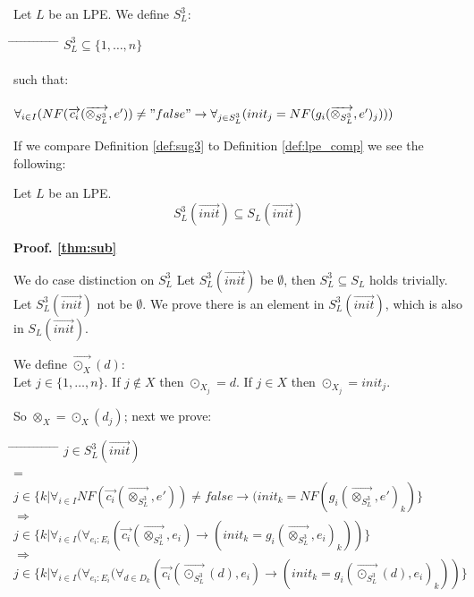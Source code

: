 \index{}\documentclass[a4paper,10pt]{article}
\theoremstyle{plain}
\theoremstyle{definition}
\newcommand{\ovr}{\overrightarrow}
\newcommand{\tb}{\textbf}
\newcommand{\tab}{\hspace*{5.mm} \= \hspace*{5.mm} \= \hspace*{5.mm} \= \hspace*{5.mm} \= \hspace*{5.mm} \= \hspace*{5.mm}  \= \hspace*{5.mm}  \= \hspace*{5.mm}  \= \hspace*{5.mm} \= \hspace*{5.mm} \= \hspace*{5.mm}  \= \hspace*{5.mm}  \= \hspace*{5.mm}\kill}
\begin{document}
\begin{defn} \label{def:sug3} Let $L$ be an LPE. We define $S_L^3$:

\begin{tabbing}
\tab
$ S_L^3 \subseteq \lbrace 1, \ldots, n \rbrace $ \\ \\
such that:\\ \\
$\forall_{i \in I} (NF( \ovr{c_i} ( \ovr{\otimes_{S_L^3}}, e' ) ) \not= "false" \rightarrow \forall_{j \in S_L^3}(init_j =  NF( g_i(\ovr{\otimes_{S_L^3}}, e' )_j))) $
\end{tabbing}
If we compare Definition \ref{def:sug3} to Definition \ref{def:lpe_comp} we see the following:
\begin{thm} Let $L$ be an LPE. \label{thm:sub}
$$S_L^3(\ovr{init}) \subseteq S_L(\ovr{init}) $$
\end{thm} 
\begin{flushleft}
\tb{Proof. \ref{thm:sub}}
\end{flushleft}
We do case distinction on $S_L^3$
Let $S_L^3(\ovr{init})$ be $\emptyset$, then $S_L^3 \subseteq S_L$ holds trivially.
Let $S_L^3(\ovr{init})$ not be $\emptyset$. We prove there is an element in $S_L^3(\ovr{init})$, which is also in $S_L(\ovr{init})$.
\begin{defn} We define $\ovr{\odot_X}(d)$:\\
Let $j \in \lbrace 1, \dots, n \rbrace $. 
If $j \not\in X$ then $\odot_{X_j} = d$. 
If $j \in X$ then $\odot_{X_j} = init_j$.
\end{defn}
So $\otimes_X = \odot_X(d_j)$; next we prove:
\begin{tabbing}
\tab
\> \> $j \in S_L^3(\ovr{init})$\\
\> = \> \> \\
\> \> $j \in \lbrace k \vert \forall_{i \in I} NF(\ovr{c_i}( \ovr{\otimes_{S_L^3}}, e')) \neq false \rightarrow (init_k = NF(g_i (\ovr{\otimes_{S_L^3}}, e' )_k)  \rbrace$\\
\> $\Rightarrow$ \> \> \\
\> \> $j \in \lbrace k \vert \forall_{i \in I} (\forall_{e_i:E_i} (\ovr{c_i}( \ovr{\otimes_{S_L^3}}, e_i) \rightarrow (init_k = g_i (\ovr{\otimes_{S_L^3}}, e_i )_k))  \rbrace$\\
\> $\Rightarrow$ \> \> \\
\> \> $j \in \lbrace k \vert \forall_{i \in I} (\forall_{e_i:E_i} (\forall_{d\in D_k} (\ovr{c_i}( \ovr{\odot_{S_L^3}}(d), e_i) \rightarrow (init_k = g_i (\ovr{\odot_{S_L^3}}(d), e_i )_k))  \rbrace $ \\

\end{tabbing}
\end{defn}
\end{document}
